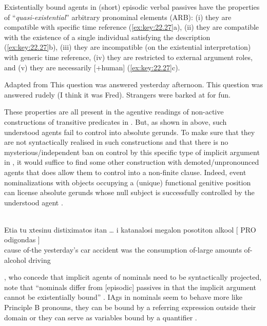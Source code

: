 \documentclass[output=paper]{langsci/langscibook}
\begin{document}
Existentially bound agents in (short) episodic verbal passives have
the properties of  \enquote{\emph{quasi-existential}}
arbitrary pronominal elements (ARB): (i) they are compatible with specific time
reference (\ref{ex:key:22.27}a), (ii) they are compatible with the existence of
a single individual satisfying the description (\ref{ex:key:22.27}b), (iii)
they are incompatible (on the existential interpretation) with generic time
reference, (iv) they are restricted to external argument roles, and (v) they
are necessarily [+human] (\ref{ex:key:22.27}c).

\ea%
    \label{ex:key:22.27} Adapted from \textcite{Roberts2014b}
    \ea This question was answered yesterday afternoon.
    \ex This question was answered rudely (I think it was Fred).
    \ex Strangers were barked at for fun.
    \z
\z

These properties are all present in the agentive readings of non-active
constructions of transitive predicates in . But, as shown in
 above, such understood agents fail to control into absolute
gerunds. To make sure that they are not syntactically realised in such
constructions and that there is no mysterious/independent ban on control by
this specific type of implicit argument in , it would suffice to find some
other construction with de\-mot\-ed/un\-pro\-nounced agents that does allow them to
control into a non-finite clause. Indeed, event nominalizations with objects
occupying a (unique) functional genitive position can license absolute gerunds
whose null subject is successfully controlled by the understood agent
.

\ea%
    \label{ex:key:22.28}\\
    \gll    Etia  tu  xtesinu  distiximatos  itan \dots{} i  katanalosi megalon  posotiton  alkool    [ PRO  odigondas ]\\
            cause   of-the  yesterday’s  {car accident}  was {} the  consumption of-large  amounts  of-alcohol {} {} driving\\
\z

\citet{AlexiadouEtAl2015}, who concede that implicit agents of nominals need to
be syntactically projected, note that “nominals differ from [episodic] passives
in that the implicit argument cannot be existentially bound”
\parencite[238]{AlexiadouEtAl2015}. \glspl{IAg} in nominals seem to behave more
like Principle B pronouns, they can be bound by a referring expression outside
their  domain or they can serve as variables bound by a quantifier
.
\end{document}
